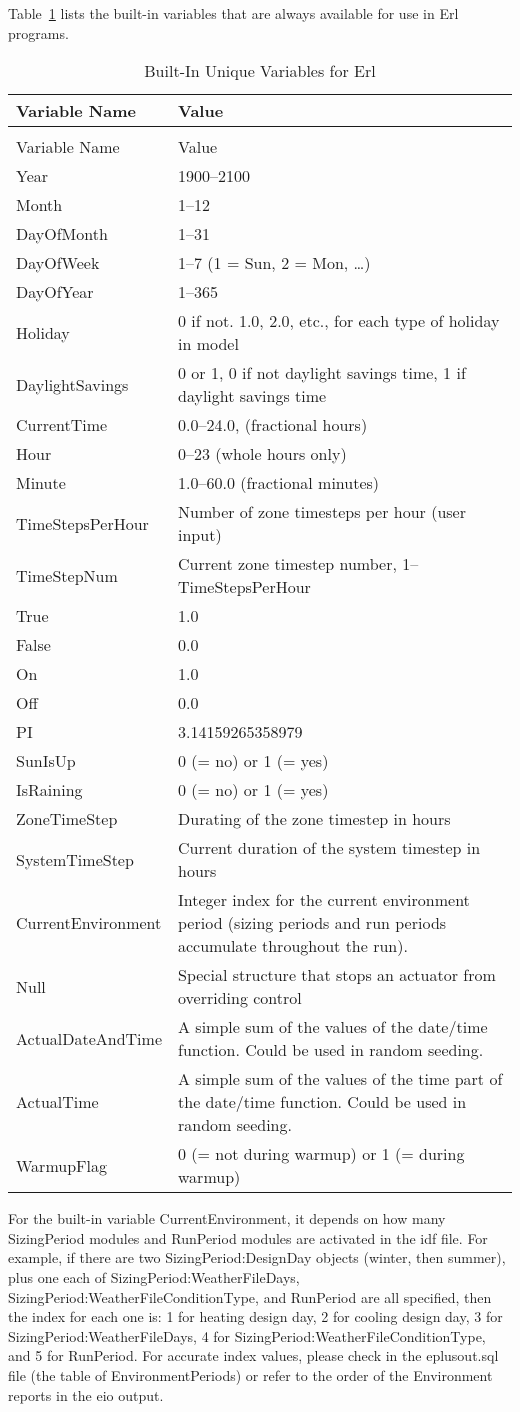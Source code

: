 Table~\ref{table:built-in-unique-variables-for-erl} lists the built-in variables that are always available for use in Erl programs.

\begin{longtable}[c]{p{1.5in}p{4.5in}}
\caption{Built-In Unique Variables for Erl \label{table:built-in-unique-variables-for-erl}} \tabularnewline
\toprule 
Variable Name & Value \tabularnewline
\midrule
\endfirsthead

\caption[]{Built-In Unique Variables for Erl} \tabularnewline
\toprule 
Variable Name & Value \tabularnewline
\midrule
\endhead

Year & 1900--2100 \tabularnewline
Month & 1--12 \tabularnewline
DayOfMonth & 1--31 \tabularnewline
DayOfWeek & 1--7 (1 = Sun, 2 = Mon, \ldots) \tabularnewline
DayOfYear & 1--365 \tabularnewline
Holiday & 0 if not. 1.0, 2.0, etc., for each type of holiday in model \tabularnewline
DaylightSavings & 0 or 1, 0 if not daylight savings time, 1 if daylight savings time \tabularnewline
CurrentTime & 0.0--24.0, (fractional hours) \tabularnewline
Hour & 0--23 (whole hours only) \tabularnewline
Minute & 1.0--60.0 (fractional minutes) \tabularnewline
TimeStepsPerHour & Number of zone timesteps per hour (user input) \tabularnewline
TimeStepNum & Current zone timestep number, 1--TimeStepsPerHour \tabularnewline
True & 1.0 \tabularnewline
False & 0.0 \tabularnewline
On & 1.0 \tabularnewline
Off & 0.0 \tabularnewline
PI & 3.14159265358979 \tabularnewline
SunIsUp & 0 (= no) or 1 (= yes) \tabularnewline
IsRaining & 0 (= no) or 1 (= yes) \tabularnewline
ZoneTimeStep & Durating of the zone timestep in hours \tabularnewline
SystemTimeStep & Current duration of the system timestep in hours \tabularnewline
CurrentEnvironment & Integer index for the current environment period (sizing periods and run periods accumulate throughout the run). \tabularnewline
Null & Special structure that stops an actuator from overriding control \tabularnewline
ActualDateAndTime & A simple sum of the values of the date/time function. Could be used in random seeding. \tabularnewline
ActualTime & A simple sum of the values of the time part of the date/time function. Could be used in random seeding. \tabularnewline
WarmupFlag & 0 (= not during warmup) or 1 (= during warmup) \tabularnewline
\bottomrule
\end{longtable}

For the built-in variable CurrentEnvironment, it depends on how many SizingPeriod modules and RunPeriod modules are activated in the idf file. For example, if there are two SizingPeriod:DesignDay objects (winter, then summer), plus one each of SizingPeriod:WeatherFileDays, SizingPeriod:WeatherFileConditionType, and RunPeriod are all specified, then the index for each one is: 1 for heating design day, 2 for cooling design day, 3 for SizingPeriod:WeatherFileDays, 4 for SizingPeriod:WeatherFileConditionType, and 5 for RunPeriod. For accurate index values, please check in the eplusout.sql file (the table of EnvironmentPeriods) or refer to the order of the Environment reports in the eio output. 

